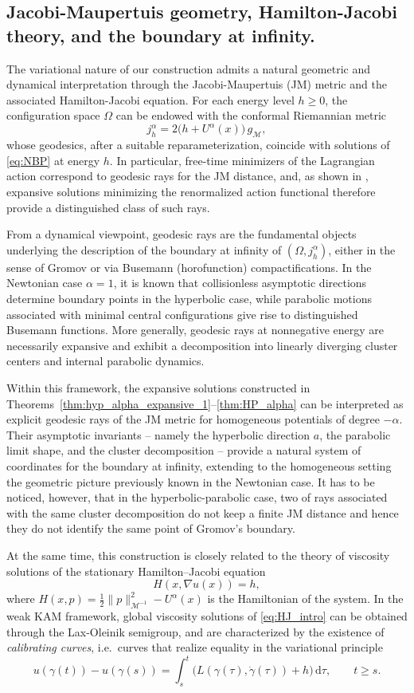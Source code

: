 \documentclass[a4paper,10pt]{amsart}
\newcommand{\ud}{\mathrm{d}}
\theoremstyle{plain}
\theoremstyle{definition}
\numberwithin{equation}{section}
\numberwithin{thm}{section}
\begin{document}
\subsection{Jacobi-Maupertuis geometry, Hamilton-Jacobi theory, and the boundary at infinity.}
The variational nature of our construction admits a natural geometric and dynamical interpretation through the Jacobi-Maupertuis (JM) metric and the associated Hamilton-Jacobi equation. 
For each energy level $h\ge 0$, the configuration space $\Omega$ can be endowed with the conformal Riemannian metric
\[
j_h^\alpha = 2\bigl(h + U^\alpha(x)\bigr)\, g_{\mathcal M},
\]
whose geodesics, after a suitable reparameterization, coincide with solutions of \eqref{eq:NBP} at energy $h$. In particular, free-time minimizers of the Lagrangian action correspond to geodesic rays for the JM distance, and, as shown in \cite{PolimeniTerracini}, expansive solutions minimizing the renormalized action functional therefore provide a distinguished class of such rays.

From a dynamical viewpoint, geodesic rays are the fundamental objects underlying the description of the boundary at infinity of $(\Omega, j_h^\alpha)$, either in the sense of Gromov or via Busemann (horofunction) compactifications. In the Newtonian case $\alpha=1$, it is known that collisionless asymptotic directions determine boundary points in the hyperbolic case, while parabolic motions associated with minimal central configurations give rise to distinguished Busemann functions. More generally, geodesic rays at nonnegative energy are necessarily expansive and exhibit a decomposition into linearly diverging cluster centers and internal parabolic dynamics.

Within this framework, the expansive solutions constructed in Theorems~\ref{thm:hyp_alpha_expansive_1}--\ref{thm:HP_alpha} can be interpreted as explicit geodesic rays of the JM metric for homogeneous potentials of degree $-\alpha$. Their asymptotic invariants -- namely the hyperbolic direction $a$, the parabolic limit shape, and the cluster decomposition -- provide a natural system of coordinates for the boundary at infinity, extending to the homogeneous setting the geometric picture previously known in the Newtonian case. It has to be noticed, however, that in the hyperbolic-parabolic case, two of rays associated with the same cluster decomposition do not keep a finite JM distance and hence they do not identify the same point of Gromov's boundary.

At the same time, this construction is closely related to the theory of viscosity solutions of the stationary Hamilton--Jacobi equation
\begin{equation}\label{eq:HJ_intro}
    H(x,\nabla u(x)) = h,
\end{equation}
where $H(x,p)=\frac12\|p\|_{\mathcal M^{-1}}^2 - U^\alpha(x)$ is the Hamiltonian of the system. In the weak KAM framework, global viscosity solutions of \eqref{eq:HJ_intro} can be obtained through the Lax-Oleinik semigroup, and are characterized by the existence of \emph{calibrating curves}, i.e.\ curves that realize equality in the variational principle
\[
u(\gamma(t)) - u(\gamma(s)) = \int_s^t \bigl( L(\gamma(\tau),\dot\gamma(\tau)) + h \bigr)\, \ud\tau,
\qquad t\ge s.
\]
\end{document}
